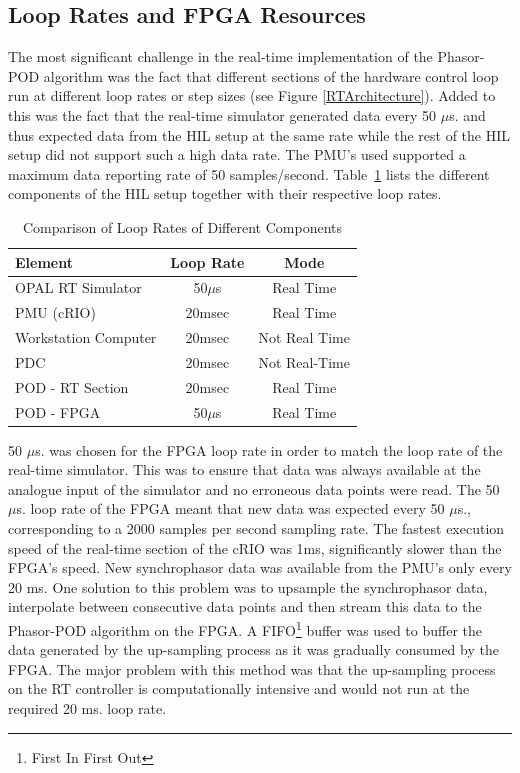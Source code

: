 \documentclass[journal]{IEEEtran}
\begin{document}
\subsection{Loop Rates and FPGA Resources}\label{looprate}
The most significant challenge in the real-time implementation of the Phasor-POD algorithm was the fact that different sections of the hardware control loop run at different loop rates or step sizes (see Figure \ref{RTArchitecture}). Added to this was the fact that the real-time simulator generated data every 50 $\mu$s. and thus expected data from the HIL setup at the same rate while the rest of the HIL setup did not support such a high data rate. The PMU\rq{s} used supported a maximum data reporting rate of 50 samples/second. Table~\ref{ex:LoopRates} lists the different components of the HIL setup together with their respective loop rates.
\begin{table}[!ht]
\caption{Comparison of Loop Rates of Different Components}\label{ex:LoopRates}
\begin{center}
\begin{tabular}{|l|c|c|}
\hline \textbf{Element} & \textbf{Loop Rate} & \textbf{Mode} \\
\hline OPAL RT Simulator & 50$\mu$s & Real Time \\ 
\hline PMU (cRIO) & 20msec & Real Time \\ 
\hline Workstation Computer& 20msec & Not Real Time \\ 
\hline PDC & 20msec & Not Real-Time \\ %
\hline POD - RT Section & 20msec & Real Time \\ 
\hline POD - FPGA & 50$\mu$s & Real Time \\ 
\hline 
\end{tabular}
\end{center}
\end{table} 

50 $\mu$s. was chosen for the FPGA loop rate in order to match the loop rate of the real-time simulator. This was to ensure that data was always available at the analogue input of the simulator and no erroneous data points were read. The 50 $\mu$s. loop rate of the FPGA meant that new data was expected every 50 $\mu$s., corresponding to a 2000 samples per second sampling rate. The fastest execution speed of the real-time section of the cRIO was 1ms, significantly slower than the FPGA\rq{s} speed. New synchrophasor data was available from the PMU\rq{s} only every 20 ms. One solution to this problem was to upsample the synchrophasor data, interpolate between consecutive data points and then stream this data to the Phasor-POD algorithm on the FPGA. A FIFO\footnote{First In First Out} buffer was used to buffer the data generated by the up-sampling process as it was gradually consumed by the FPGA. The major problem with this method was that the up-sampling process on the RT controller is computationally intensive and would not run at the required 20 ms. loop rate.\\
\end{document}
